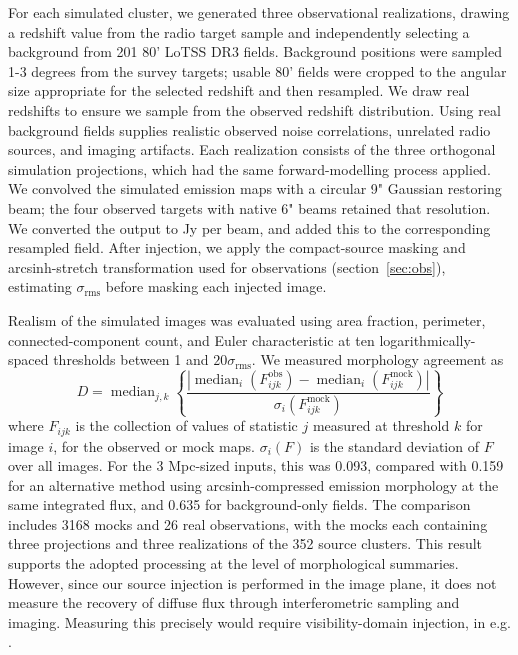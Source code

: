 For each simulated cluster, we generated three observational realizations, drawing a redshift value from the radio target sample and independently selecting a background from 201 80' LoTSS DR3 fields.
Background positions were sampled 1-3 degrees from the survey targets; usable 80' fields were cropped to the angular size appropriate for the selected redshift and then resampled.
We draw real redshifts to ensure we sample from the observed redshift distribution.
Using real background fields supplies realistic observed noise correlations, unrelated radio sources, and imaging artifacts.
Each realization consists of the three orthogonal simulation projections, which had the same forward-modelling process applied.
We convolved the simulated emission maps with a circular 9" Gaussian restoring beam; the four observed targets with native 6" beams retained that resolution.
We converted the output to Jy per beam, and added this to the corresponding resampled field.
After injection, we apply the compact-source masking and arcsinh-stretch transformation used for observations (section~\ref{sec:obs}), estimating $\sigma_\text{rms}$ before masking each injected image.

Realism of the simulated images was evaluated using area fraction, perimeter, connected-component count, and Euler characteristic at ten logarithmically-spaced thresholds between 1 and $20\sigma_\text{rms}$.
We measured morphology agreement as
\newcommand{\median}{\operatorname{median}}
\begin{equation}
    D = \median_{j,k} \left\{\frac{\left|\median_i\left(F^\text{obs}_{ijk}\right) - \median_i\left(F^\text{mock}_{ijk}\right)\right|}{\sigma_i\left(F^\text{mock}_{ijk}\right)} \right\}
\end{equation}
where $F_{ijk}$ is the collection of values of statistic $j$ measured at threshold $k$ for image $i$, for the observed or mock maps.
$\sigma_i(F)$ is the standard deviation of $F$ over all images.
For the 3 Mpc-sized inputs, this was 0.093, compared with 0.159 for an alternative method using arcsinh-compressed emission morphology at the same integrated flux, and 0.635 for background-only fields.
The comparison includes 3168 mocks and 26 real observations, with the mocks each containing three projections and three realizations of the 352 source clusters.
This result supports the adopted processing at the level of morphological summaries.
However, since our source injection is performed in the image plane, it does not measure the recovery of diffuse flux through interferometric sampling and imaging.
Measuring this precisely would require visibility-domain injection, in e.g. \cite{Bruno2023}.

